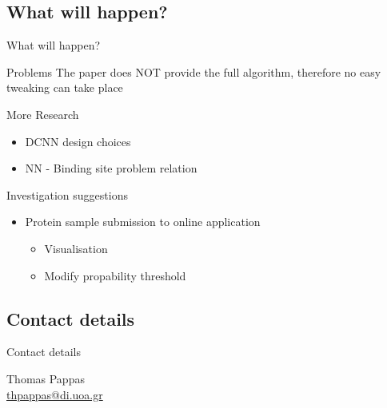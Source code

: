 \documentclass{beamer}
\begin{document}
\subsection{What will happen?}

\begin{frame}{What will happen?}
  \begin{block}{Problems}
    The paper does NOT provide the full algorithm, therefore no easy tweaking can take place
  \end{block}
  \begin{block}{More Research}
    \begin{itemize}
      \item DCNN design choices
      \item NN - Binding site problem relation
    \end{itemize}
  \end{block}
  \begin{block}{Investigation suggestions}
    \begin{itemize}
      \item Protein sample submission to online application
      \begin{itemize}
        \item Visualisation
        \item Modify propability threshold
      \end{itemize}
    \end{itemize}
  \end{block}
\end{frame}

\subsection{Contact details}

\begin{frame}{Contact details}
  \begin{center}
    Thomas Pappas\\
    \href{mailto:thpappas@di.uoa.gr}{thpappas@di.uoa.gr}
  \end{center}
\end{frame}
\end{document}

